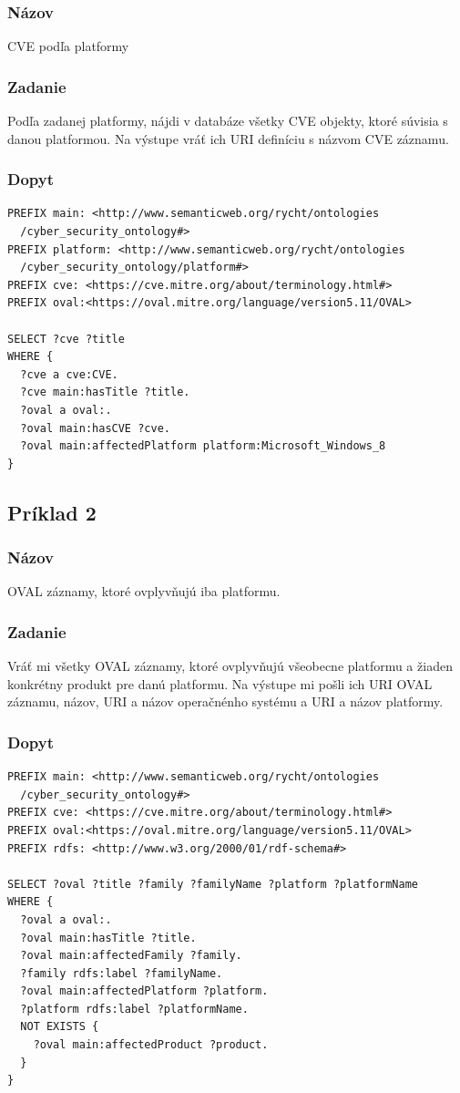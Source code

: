 \documentclass[12pt, a4paper, oneside]{book}
\begin{document}
\subsubsection*{Názov}
CVE podľa platformy

\subsubsection*{Zadanie}
Podľa zadanej platformy, nájdi v databáze všetky CVE objekty, ktoré súvisia s danou platformou. Na výstupe vráť ich URI definíciu s názvom CVE záznamu.

\subsubsection*{Dopyt}
\begin{verbatim}
PREFIX main: <http://www.semanticweb.org/rycht/ontologies
  /cyber_security_ontology#>
PREFIX platform: <http://www.semanticweb.org/rycht/ontologies
  /cyber_security_ontology/platform#>
PREFIX cve: <https://cve.mitre.org/about/terminology.html#>
PREFIX oval:<https://oval.mitre.org/language/version5.11/OVAL>

SELECT ?cve ?title
WHERE {
  ?cve a cve:CVE.
  ?cve main:hasTitle ?title.
  ?oval a oval:.
  ?oval main:hasCVE ?cve.
  ?oval main:affectedPlatform platform:Microsoft_Windows_8
}
\end{verbatim}


\subsection*{Príklad 2}
\label{sec:priklad2}
\subsubsection*{Názov}
OVAL záznamy, ktoré ovplyvňujú iba platformu.

\subsubsection*{Zadanie}
Vráť mi všetky OVAL záznamy, ktoré ovplyvňujú všeobecne platformu a žiaden konkrétny produkt pre danú platformu. Na výstupe mi pošli ich URI OVAL záznamu, názov, URI a názov operačnénho systému a URI a názov platformy.

\subsubsection*{Dopyt}
\begin{verbatim}
PREFIX main: <http://www.semanticweb.org/rycht/ontologies
  /cyber_security_ontology#>
PREFIX cve: <https://cve.mitre.org/about/terminology.html#>
PREFIX oval:<https://oval.mitre.org/language/version5.11/OVAL>
PREFIX rdfs: <http://www.w3.org/2000/01/rdf-schema#>

SELECT ?oval ?title ?family ?familyName ?platform ?platformName
WHERE {
  ?oval a oval:.
  ?oval main:hasTitle ?title.
  ?oval main:affectedFamily ?family.
  ?family rdfs:label ?familyName.
  ?oval main:affectedPlatform ?platform.
  ?platform rdfs:label ?platformName.
  NOT EXISTS {
    ?oval main:affectedProduct ?product.
  }
}
\end{verbatim}
\end{document}
